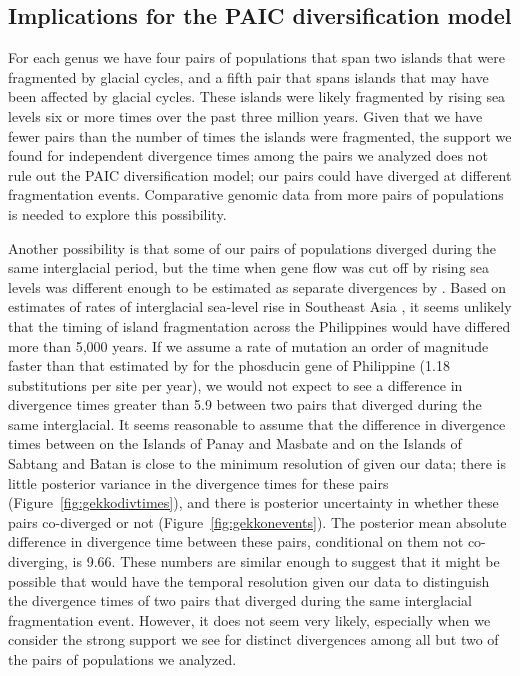 \subsection{Implications for the PAIC diversification model}

For each genus we have four pairs of populations that span two islands
that were fragmented by glacial cycles, and a fifth pair that spans
islands that may have been affected by glacial cycles.
These islands were likely fragmented by rising sea levels six or more times
over the past three million years.
Given that we have fewer pairs than the number of times the islands were
fragmented,
the support we found for independent divergence times among the pairs we
analyzed does not rule out the PAIC diversification model; our pairs could have
diverged at different fragmentation events.
Comparative genomic data from more pairs of populations is needed to explore
this possibility.

Another possibility is that some of our pairs of populations diverged during
the same interglacial period, but the time when gene flow was cut off by rising
sea levels was different enough to be estimated as separate divergences by
\ecoevolity.
Based on estimates of rates of interglacial sea-level rise in Southeast Asia
\citep{Hanebuth2000,Sathiamurthy2006}, it seems unlikely that the timing of
island fragmentation across the Philippines would have differed more than 5,000
years.
If we assume a rate of mutation an order of magnitude faster than that
estimated by \citet{Siler2012} for the phosducin gene of Philippine 
(1.18 substitutions per site per year),
we would not expect to see a difference in divergence times greater than
5.9
between two pairs that diverged during the same interglacial.
It seems reasonable to assume that the difference in divergence times between
 on the Islands of Panay and Masbate and
 on the Islands of Sabtang and Batan
is close to the minimum resolution of \ecoevolity given our data;
there is little posterior variance in the divergence times for these pairs
(Figure~\ref{fig:gekkodivtimes}),
and there is posterior uncertainty in whether these pairs co-diverged or not 
(Figure~\ref{fig:gekkonevents}).
The posterior mean absolute difference in divergence time between these pairs,
conditional on them not co-diverging, is
9.66.
These numbers are similar enough to suggest that it might be possible that
\ecoevolity would have the temporal resolution given our data to distinguish
the divergence times of two pairs that diverged during the same interglacial
fragmentation event.
However, it does not seem very likely, especially when we consider
the strong support we see for distinct divergences among all but
two of the pairs of populations we analyzed. 


